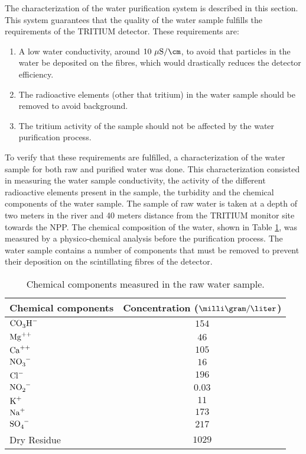 The characterization of the water purification system is described in this section. This system guarantees that the quality of the water sample fulfills the requirements of the TRITIUM detector. These requirements are:

\begin{enumerate}
\item{} A low water conductivity, around $10~\mu\text{S}/\cm$, to avoid that particles in the water be deposited on the fibres, which would drastically reduces the detector efficiency.

\item{} The radioactive elements (other that tritium) in the water sample should be removed to avoid background.

\item{} The tritium activity of the sample should not be affected by the water purification process. 

\end{enumerate}

To verify that these requirements are fulfilled, a characterization of the water sample for both raw and purified water was done. This characterization consisted in measuring the water sample conductivity, the activity of the different radioactive elements present in the sample, the turbidity and the chemical components of the water sample. The sample of raw water is taken at a depth of two meters in the river and 40 meters distance from the TRITIUM monitor site towards the NPP. The chemical composition of the water, shown in Table \ref{tab:ChemicalComponentsRawWater}, was measured by a physico-chemical analysis before the purification process. The water sample contains a number of components that must be removed to prevent their deposition on the scintillating fibres of the detector.

\begin{table}[htbp]
\centering{}%
\begin{tabular}{lc}
\toprule 
Chemical components & Concentration ($\milli\gram/\liter$) \tabularnewline
\midrule
\midrule 
$\ce{CO_{3}H^-}$ & $154$ \tabularnewline
$\ce{Mg^{++}}$ & $46$ \tabularnewline
$\ce{Ca^{++}}$ & $105$ \tabularnewline
$\ce{NO_{3}^-}$ & $16$ \tabularnewline
$\ce{Cl^-}$ & $196$ \tabularnewline
$\ce{NO_{2}^-}$ & $0.03$ \tabularnewline
$\ce{K^{+}}$ & $11$ \tabularnewline
$\ce{Na^{+}}$ & $173$ \tabularnewline
$\ce{SO_{4}^-}$ & $217$ \tabularnewline
Dry Residue & $1029$ \tabularnewline
\bottomrule
\end{tabular}
\caption{Chemical components measured in the raw water sample.}
\label{tab:ChemicalComponentsRawWater}
\end{table}

